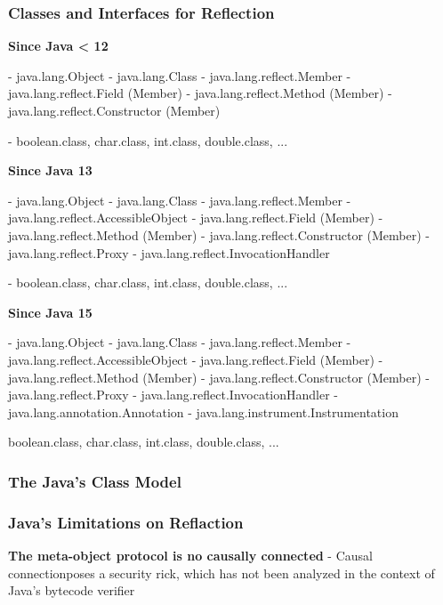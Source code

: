 \subsubsection{Classes and Interfaces for Reflection}

\textbf{Since Java < 12}

- java.lang.Object
	- java.lang.Class
	- java.lang.reflect.Member
		- java.lang.reflect.Field (Member)
		- java.lang.reflect.Method (Member)
		- java.lang.reflect.Constructor (Member)
		
- boolean.class, char.class, int.class, double.class, ...

\textbf{Since Java 13}

- java.lang.Object
	- java.lang.Class
	- java.lang.reflect.Member
	- java.lang.reflect.AccessibleObject
		- java.lang.reflect.Field (Member)
		- java.lang.reflect.Method (Member)
		- java.lang.reflect.Constructor (Member)
	- java.lang.reflect.Proxy
	- java.lang.reflect.InvocationHandler

- boolean.class, char.class, int.class, double.class, ...

\textbf{Since Java 15}

- java.lang.Object
	- java.lang.Class
	- java.lang.reflect.Member
	- java.lang.reflect.AccessibleObject
		- java.lang.reflect.Field (Member)
		- java.lang.reflect.Method (Member)
		- java.lang.reflect.Constructor (Member)
	- java.lang.reflect.Proxy
	- java.lang.reflect.InvocationHandler
	- java.lang.annotation.Annotation
	- java.lang.instrument.Instrumentation

boolean.class, char.class, int.class, double.class, ...

\subsubsection{The Java's Class Model}


\subsubsection{Java's Limitations on Reflaction}

\textbf{The meta-object protocol is no causally connected}
	- Causal connectionposes a security rick, which has not been analyzed in the context of Java's bytecode verifier

